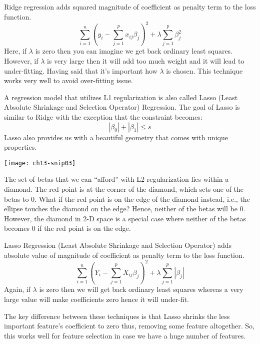 Ridge regression adds squared magnitude of coefficient as penalty term to the loss function.
\begin{equation}
\sum_{i=1}^{n}\left(y_{i}-\sum_{j=1}^{p} x_{i j} \beta_{j}\right)^{2}+\lambda \sum_{j=1}^{p} \beta_{j}^{2}
\end{equation}
Here, if $\lambda$ is zero then you can imagine we get back ordinary least squares. However, if $\lambda$  is very large then it will add too much weight and it will lead to under-fitting. Having said that it's important how $\lambda$  is chosen. This technique works very well to avoid over-fitting issue.



A regression model that utilizes L1 regularization is also called Lasso (Least Absolute Shrinkage and Selection Operator) Regression. The goal of Lasso is similar to Ridge with the exception that the constraint becomes:
\begin{equation}
\left|\beta_{0}\right|+\left|\beta_{1}\right| \leq s
\end{equation}
Lasso also provides us with a beautiful geometry that comes with unique properties.
\begin{marginfigure}
\texttt{[image: ch13-snip03]}
\end{marginfigure}

The set of betas that we can  ``afford'' with L2 regularization lies within a diamond. The red point is at the corner of the diamond, which sets one of the betas to 0.
What if the red point is on the edge of the diamond instead, i.e., the ellipse touches the diamond on the edge? Hence, neither of the betas will be 0. However, the diamond in 2-D space is a special case where neither of the betas becomes 0 if the red point is on the edge.

Lasso Regression (Least Absolute Shrinkage and Selection Operator) adds absolute value of magnitude of coefficient as penalty term to the loss function.
\begin{equation}
\sum_{i=1}^{n}\left(Y_{i}-\sum_{j=1}^{p} X_{i j} \beta_{j}\right)^{2}+\lambda \sum_{j=1}^{p}\left|\beta_{j}\right|
\end{equation}
Again, if $\lambda$ is zero then we will get back ordinary least squares whereas a very large value will make coefficients zero hence it will under-fit.

The key difference between these techniques is that Lasso shrinks the less important feature's coefficient to zero thus, removing some feature altogether. So, this works well for feature selection in case we have a huge number of features.

